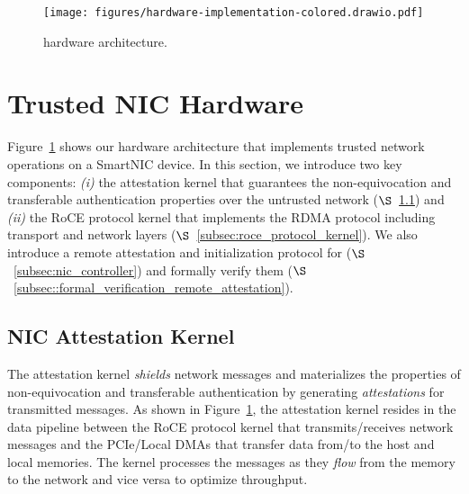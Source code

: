 \begin{figure}[t!]
    \centering
     \texttt{[image: figures/hardware-implementation-colored.drawio.pdf]}
    \caption{\projecttitle{} hardware architecture.}
     \label{fig:hardware-design}
\end{figure}


\section{Trusted NIC Hardware}
\label{sec:t-nic-hardware}



Figure~\ref{fig:hardware-design} shows our \projecttitle{} hardware architecture that implements trusted network operations on a SmartNIC device. In this section, we introduce two key components: \emph{(i)} the attestation kernel that guarantees the non-equivocation and transferable authentication properties over the untrusted network ($\S$~\ref{subsec:nic_attest_kernel}) and \emph{(ii)} the RoCE protocol kernel that implements the RDMA protocol including transport and network layers ($\S$~\ref{subsec:roce_protocol_kernel}). We also introduce a remote attestation and initialization protocol for \projecttitle{} ($\S$~\ref{subsec:nic_controller}) and formally verify them ($\S$~\ref{subsec::formal_verification_remote_attestation}).

\subsection{NIC Attestation Kernel}
\label{subsec:nic_attest_kernel}
The attestation kernel {\em shields} network messages and materializes the properties of non-equivocation and transferable authentication by generating {\em attestations} for transmitted messages. As shown in Figure~\ref{fig:hardware-design}, the attestation kernel resides in the data pipeline between the RoCE protocol kernel that transmits/receives network messages and the PCIe/Local DMAs that transfer data from/to the host and local memories.
The kernel processes the messages as they {\em flow} from the memory to the network and vice versa to optimize throughput. 


